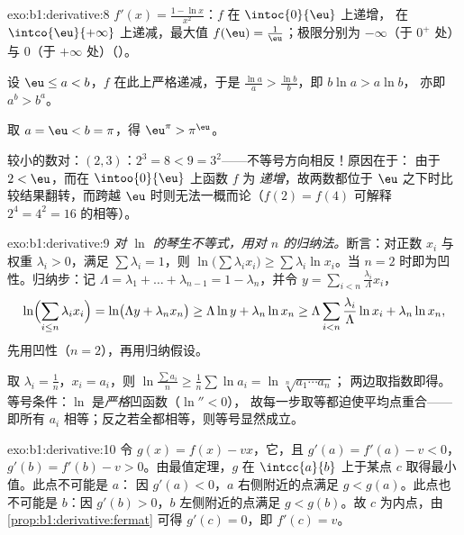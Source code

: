 \begin{solution}{exo:b1:derivative:8}
$f'(x) = \frac{1 - \ln x}{x^2}$：$f$ 在 $\intoc{0}{\eu}$ 上递增，
在 $\intco{\eu}{+\infty}$ 上递减，最大值 $f(\eu) =
\frac1\eu$；极限分别为 $-\infty$（于 $0^+$ 处）与 $0$（于 $+\infty$ 处）（）。

设 $\eu \leq a < b$，$f$ 在此上严格递减，于是
$\frac{\ln a}{a} > \frac{\ln b}{b}$，即 $b \ln a > a \ln b$，
亦即 $a^b > b^a$。

取 $a = \eu < b = \pi$，得 $\eu^\pi > \pi^\eu$。

较小的数对：$(2, 3)$：$2^3 = 8 < 9 = 3^2$——不等号方向相反！原因在于：
由于 $2 < \eu$，而在 $\intoo{0}{\eu}$ 上函数 $f$ 为
\emph{递增}，故两数都位于
$\eu$ 之下时比较结果翻转，而跨越 $\eu$ 时则无法一概而论（$f(2) = f(4)$
可解释 $2^4 = 4^2 = 16$ 的相等）。
\end{solution}

\begin{solution}{exo:b1:derivative:9}
\emph{对 $\ln$ 的琴生不等式，用对 $n$ 的归纳法。}断言：对正数
$x_i$ 与权重 $\lambda_i > 0$，满足 $\sum \lambda_i = 1$，则
$\ln\bigl(\sum \lambda_i x_i\bigr) \geq \sum \lambda_i \ln x_i$。当
$n = 2$ 时即为凹性。归纳步：记 $\Lambda = \lambda_1 + \dots +
\lambda_{n-1} = 1 - \lambda_n$，并令 $y = \sum_{i<n}
\frac{\lambda_i}{\Lambda} x_i$，
\[
\ln\Bigl(\sum_{i \leq n} \lambda_i x_i\Bigr)
= \ln\bigl(\Lambda y + \lambda_n x_n\bigr)
\geq \Lambda \ln y + \lambda_n \ln x_n
\geq \Lambda \sum_{i<n} \frac{\lambda_i}{\Lambda}\ln x_i
+ \lambda_n \ln x_n,
\]
先用凹性（$n = 2$），再用归纳假设。

取 $\lambda_i = \frac 1n$，$x_i = a_i$，则 $\ln\frac{\sum a_i}{n}
\geq \frac 1n \sum \ln a_i = \ln\sqrt[n]{a_1\cdots a_n}$；
两边取指数即得。等号条件：$\ln$ 是\emph{严格}凹函数（$\ln'' < 0$），
故每一步取等都迫使平均点重合——
即所有 $a_i$ 相等；反之若全都相等，则等号显然成立。
\end{solution}

\begin{solution}{exo:b1:derivative:10}
令 $g(x) = f(x) - vx$，它，且 $g'(a) = f'(a) - v < 0$，
$g'(b) = f'(b) - v > 0$。由最值定理，$g$
在 $\intcc{a}{b}$ 上于某点 $c$ 取得最小值。此点不可能是 $a$：
因 $g'(a) < 0$，$a$ 右侧附近的点满足 $g < g(a)$。此点也不可能是
$b$：因 $g'(b) > 0$，$b$ 左侧附近的点满足 $g <
g(b)$。故 $c$ 为内点，由\cref{prop:b1:derivative:fermat}
可得 $g'(c) = 0$，即 $f'(c) = v$。
\end{solution}


